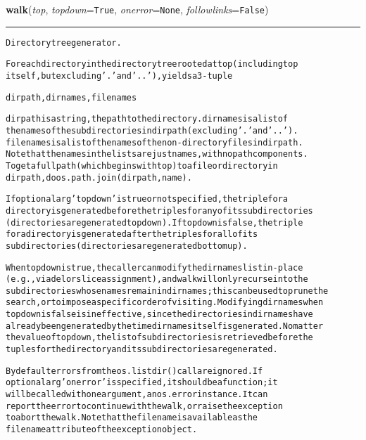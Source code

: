 \hspace{.8\funcindent}\begin{boxedminipage}{\funcwidth}

    \raggedright \textbf{walk}(\textit{top}, \textit{topdown}={\tt True}, \textit{onerror}={\tt None}, \textit{followlinks}={\tt False})

    \vspace{-1.5ex}

    \rule{\textwidth}{0.5\fboxrule}
\setlength{\parskip}{2ex}
\begin{alltt}
Directory tree generator.

For each directory in the directory tree rooted at top (including top
itself, but excluding '.' and '..'), yields a 3-tuple

    dirpath, dirnames, filenames

dirpath is a string, the path to the directory.  dirnames is a list of
the names of the subdirectories in dirpath (excluding '.' and '..').
filenames is a list of the names of the non-directory files in dirpath.
Note that the names in the lists are just names, with no path components.
To get a full path (which begins with top) to a file or directory in
dirpath, do os.path.join(dirpath, name).

If optional arg 'topdown' is true or not specified, the triple for a
directory is generated before the triples for any of its subdirectories
(directories are generated top down).  If topdown is false, the triple
for a directory is generated after the triples for all of its
subdirectories (directories are generated bottom up).

When topdown is true, the caller can modify the dirnames list in-place
(e.g., via del or slice assignment), and walk will only recurse into the
subdirectories whose names remain in dirnames; this can be used to prune the
search, or to impose a specific order of visiting.  Modifying dirnames when
topdown is false is ineffective, since the directories in dirnames have
already been generated by the time dirnames itself is generated. No matter
the value of topdown, the list of subdirectories is retrieved before the
tuples for the directory and its subdirectories are generated.

By default errors from the os.listdir() call are ignored.  If
optional arg 'onerror' is specified, it should be a function; it
will be called with one argument, an os.error instance.  It can
report the error to continue with the walk, or raise the exception
to abort the walk.  Note that the filename is available as the
filename attribute of the exception object.


\end{alltt}
\end{boxedminipage}
